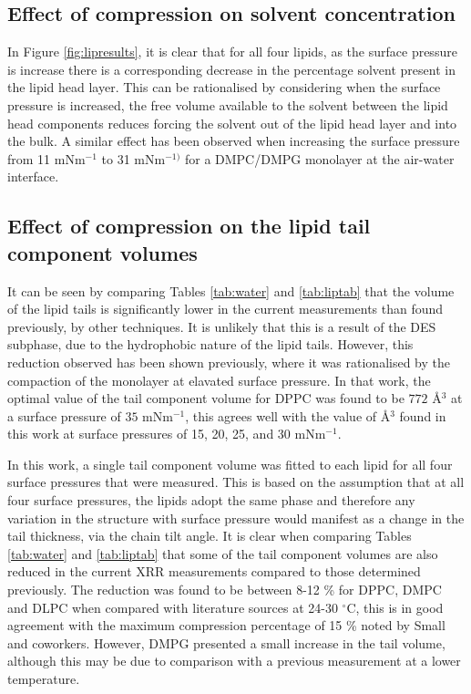 \documentclass[twoside,twocolumn,9pt]{article}
\begin{document}
\subsection{Effect of compression on solvent concentration}
In Figure \ref{fig:lipresults}, it is clear that for all four lipids, as the surface pressure is increase there is a corresponding decrease in the percentage solvent present in the lipid head layer. This can be rationalised by considering when the surface pressure is increased, the free volume available to the solvent between the lipid head components reduces forcing the solvent out of the lipid head layer and into the bulk. A similar effect has been observed when increasing the surface pressure from 11 mNm$^{-1}$ to 31 mNm$^{-1)}$ for a DMPC/DMPG monolayer at the air-water interface.\cite{Bayerl1990}

\subsection{Effect of compression on the lipid tail component volumes}
It can be seen by comparing Tables \ref{tab:water} and \ref{tab:liptab} that the volume of the lipid tails is significantly lower in the current measurements than found previously, by other techniques. It is unlikely that this is a result of the DES subphase, due to the hydrophobic nature of the lipid tails. However, this reduction observed has been shown previously,\cite{Campbell2018} where it was rationalised by the compaction of the monolayer at elavated surface pressure. In that work, the optimal value of the tail component volume for DPPC was found to be $772$ \AA${^3}$ at a surface pressure of $35$ mNm$^{-1}$, this agrees well with the value of  \AA$^3$ found in this work at surface pressures of 15, 20, 25, and 30 mNm$^{-1}$.

In this work, a single tail component volume was fitted to each lipid for all four surface pressures that were measured. This is based on the assumption that at all four surface pressures, the lipids adopt the same phase and therefore any variation in the structure with surface pressure would manifest as a change in the tail thickness, via the chain tilt angle. It is clear when comparing Tables \ref{tab:water} and \ref{tab:liptab} that some of the tail component volumes are also reduced in the current XRR measurements compared to those determined previously. The reduction was found to be between 8-12 \% for DPPC, DMPC and DLPC when compared with literature sources at 24-30 $^\circ$C, this is in good agreement with the maximum compression percentage of 15 \% noted by Small and coworkers.\cite{Small1984} However, DMPG presented a small increase in the tail volume, although this may be due to comparison with a previous measurement at a lower temperature.
\end{document}
